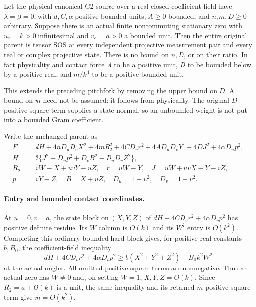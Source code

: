 \label{p0c7a15f800d9:sec:c2-two-large}

\begin{theorem}
\label{p0c7a15f800d9:thm:c2-two-large}
Let the physical canonical C2 source over a real closed coefficient
field have $\lambda=\beta=0$, with $d,C,\alpha$ positive bounded
units, $A\geq0$ bounded, and $n,m,D\geq0$ arbitrary. Suppose there is
an actual finite noncommuting stationary zero with $u_c=k>0$
infinitesimal and $v_c=a>0$ a bounded unit. Then the entire original
parent is tensor SOS at every independent projective measurement
pair and every real or complex projective state.
There is no bound on $n,D$, or on their ratio. In fact physicality and
contact force $A$ to be a positive unit, $D$ to be bounded below by
a positive real, and $m/k^4$ to be a positive bounded unit.
\end{theorem}

This extends the preceding pitchfork by removing the upper bound on
$D$. A bound on $m$ need not be assumed: it follows from physicality.
The original $D$ positive square term supplies a state normal, so an unbounded
weight is not put into a bounded Gram coefficient.

Write the unchanged parent as
\[
\begin{split}
F={}&dH+4nD_uD_vX^2+4mR_2^2+4CD_vr^2
       +4AD_uD_vY^2+4DJ^2+4\alpha D_up^2,\\
H={}&2\{J^2+D_up^2+D_vB^2-D_uD_vZ^2\},\\
R_2={}&vW-X+uvY-uZ,\quad r=uW-Y,\quad
J=uW+uvX-Y-vZ,\\
p={}&vY-Z,\quad B=X+uZ,\quad D_u=1+u^2,\quad D_v=1+v^2.
\end{split}                                                    \tag{TD1}
\]

\paragraph{Entry and bounded contact coordinates.}
At $u=0,v=a$, the state block on $(X,Y,Z)$ of
$dH+4CD_vr^2+4\alpha D_up^2$ has positive definite residue.
Its $W$ column is $O(k)$ and its $W^2$ entry is $O(k^2)$.
Completing this ordinary bounded hard block gives, for positive
real constants $b,B_0$, the coefficient-field inequality
\[
 dH+4CD_vr^2+4\alpha D_up^2
 \geq b(X^2+Y^2+Z^2)-B_0 k^2W^2
\]
at the actual angles. All omitted positive square terms are nonnegative.
Thus an actual zero has $W\ne0$ and, on setting $W=1$,
$X,Y,Z=O(k)$. Since $R_2=a+O(k)$ is a unit, the same inequality
and its retained $m$ positive square term give $m=O(k^2)$.

